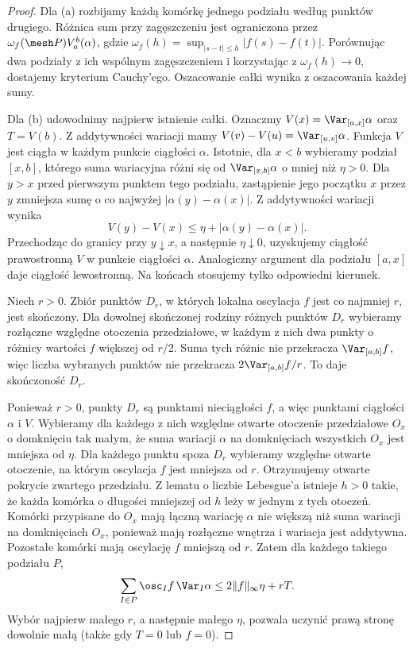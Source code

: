 \begin{proof}
Dla (a) rozbijamy każdą komórkę jednego podziału według punktów drugiego. Różnica sum przy zagęszczeniu jest ograniczona przez $\omega_f(\mesh P)V_a^b(\alpha)$, gdzie $\omega_f(h)=\sup_{|s-t|\le h}|f(s)-f(t)|$. Porównując dwa podziały z ich wspólnym zagęszczeniem i korzystając z $\omega_f(h)\to0$, dostajemy kryterium Cauchy'ego. Oszacowanie całki wynika z oszacowania każdej sumy.

Dla (b) udowodnimy najpierw istnienie całki. Oznaczmy $V(x)=\Var_{[a,x]}\alpha$ oraz $T=V(b)$. Z addytywności wariacji mamy $V(v)-V(u)=\Var_{[u,v]}\alpha$. Funkcja $V$ jest ciągła w każdym punkcie ciągłości $\alpha$. Istotnie, dla $x<b$ wybieramy podział $[x,b]$, którego suma wariacyjna różni się od $\Var_{[x,b]}\alpha$ o mniej niż $\eta>0$. Dla $y>x$ przed pierwszym punktem tego podziału, zastąpienie jego początku $x$ przez $y$ zmniejsza sumę o co najwyżej $|\alpha(y)-\alpha(x)|$. Z addytywności wariacji wynika
\[
 V(y)-V(x)\le\eta+|\alpha(y)-\alpha(x)|.
\]
Przechodząc do granicy przy $y\downarrow x$, a następnie $\eta\downarrow0$, uzyskujemy ciągłość prawostronną $V$ w punkcie ciągłości $\alpha$. Analogiczny argument dla podziału $[a,x]$ daje ciągłość lewostronną. Na końcach stosujemy tylko odpowiedni kierunek.

Niech $r>0$. Zbiór punktów $D_r$, w których lokalna oscylacja $f$ jest co najmniej $r$, jest skończony. Dla dowolnej skończonej rodziny różnych punktów $D_r$ wybieramy rozłączne względne otoczenia przedziałowe, w każdym z nich dwa punkty o różnicy wartości $f$ większej od $r/2$. Suma tych różnic nie przekracza $\Var_{[a,b]}f$, więc liczba wybranych punktów nie przekracza $2\Var_{[a,b]}f/r$. To daje skończoność $D_r$.

Ponieważ $r>0$, punkty $D_r$ są punktami nieciągłości $f$, a więc punktami ciągłości $\alpha$ i $V$. Wybieramy dla każdego z nich względne otwarte otoczenie przedziałowe $O_x$ o domknięciu tak małym, że suma wariacji $\alpha$ na domknięciach wszystkich $O_x$ jest mniejsza od $\eta$. Dla każdego punktu spoza $D_r$ wybieramy względne otwarte otoczenie, na którym oscylacja $f$ jest mniejsza od $r$. Otrzymujemy otwarte pokrycie zwartego przedziału. Z lematu o liczbie Lebesgue'a istnieje $h>0$ takie, że każda komórka o długości mniejszej od $h$ leży w jednym z tych otoczeń. Komórki przypisane do $O_x$ mają łączną wariację $\alpha$ nie większą niż suma wariacji na domknięciach $O_x$, ponieważ mają rozłączne wnętrza i wariacja jest addytywna. Pozostałe komórki mają oscylację $f$ mniejszą od $r$. Zatem dla każdego takiego podziału $P$,
\[
 \sum_{I\in P}\osc_I f\,\Var_I\alpha
 \le 2\|f\|_\infty\eta+rT.
\]
Wybór najpierw małego $r$, a następnie małego $\eta$, pozwala uczynić prawą stronę dowolnie małą (także gdy $T=0$ lub $f=0$).


\end{proof}
